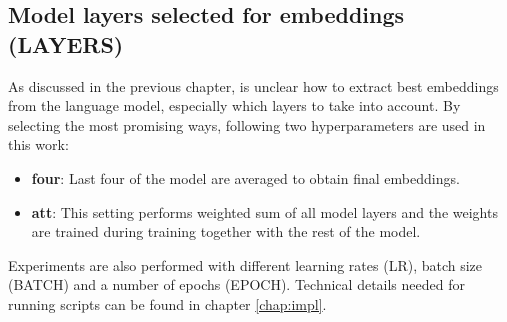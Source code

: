 \subsection{Model layers selected for embeddings (LAYERS)}
As discussed in the previous chapter, is unclear how to extract best embeddings from the language model, especially which layers to take into account. By selecting the most promising ways, following two hyperparameters are used in this work:
\begin{itemize}
\item \textbf{four}: Last four of the model are averaged to obtain final embeddings.
\item \textbf{att}: This setting performs weighted sum of all model layers and the weights are trained during training together with the rest of the model.
\end{itemize}
Experiments are also performed with different learning rates (LR), batch size (BATCH) and a number of epochs (EPOCH). 
Technical details needed for running scripts can be found in chapter \ref{chap:impl}.
\newpage

\newpage
